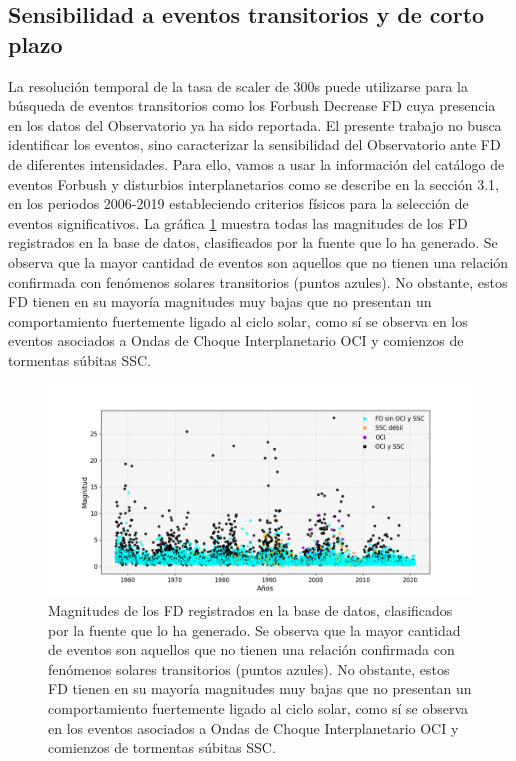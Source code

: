 \subsection{Sensibilidad a eventos transitorios y de corto plazo}
La resolución temporal de la tasa de scaler de 300s puede utilizarse para la búsqueda de eventos transitorios como los Forbush Decrease FD cuya presencia en los datos del Observatorio ya ha sido reportada. El presente trabajo no busca identificar los eventos, sino caracterizar la sensibilidad del Observatorio ante FD de diferentes intensidades. Para ello, vamos a usar la información del catálogo de eventos Forbush y disturbios interplanetarios como se describe en la sección 3.1, en los periodos 2006-2019 estableciendo criterios físicos para la selección de eventos significativos. La gráfica \ref{fig:FD_events} muestra todas las magnitudes de los FD registrados en la base de datos, clasificados por la fuente que lo ha generado. Se observa que la mayor cantidad de eventos son aquellos que no tienen una relación confirmada  con fenómenos solares transitorios (puntos azules). No obstante, estos FD tienen en su mayoría magnitudes muy bajas  que no presentan un comportamiento fuertemente ligado al ciclo solar, como sí se observa en los eventos asociados a Ondas de Choque Interplanetario OCI y comienzos de tormentas súbitas SSC. %
\begin{figure}
\centering
\includegraphics[width=1\linewidth]{Figs/Figr/forbush_events.png}
    \caption{Magnitudes de los FD registrados en la base de datos, clasificados por la fuente que lo ha generado. Se observa que la mayor cantidad de eventos son aquellos que no tienen una relación confirmada  con fenómenos solares transitorios (puntos azules). No obstante, estos FD tienen en su mayoría magnitudes muy bajas  que no presentan un comportamiento fuertemente ligado al ciclo solar, como sí se observa en los eventos asociados a Ondas de Choque Interplanetario OCI y comienzos de tormentas súbitas SSC.}
    \label{fig:FD_events}
\end{figure}
